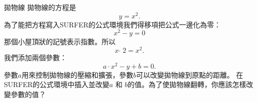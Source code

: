 \begin{surferPage}{拋物線}
拋物線的方程是 \[y=x^2.\]
為了能把方程寫入SURFER的公式環境我們得移項把公式一邊化為零：
\[x^2-y=0\]
那個小屋頂狀的記號表示指數。所以
\[ x  \,\hat{\ } \, 2 =x^2.\]
我們添加兩個參數：
\[a \cdot x^2-y+b=0.\]
參數$a$用來控制拋物線的壓縮和擴張，參數$b$可以改變拋物線到原點的距離。
\newline
在SURFER的公式環境中插入並改變$a$ 和 $b$的值。為了使拋物線翻轉，你應該怎樣改變參數的值？
\end{surferPage}
